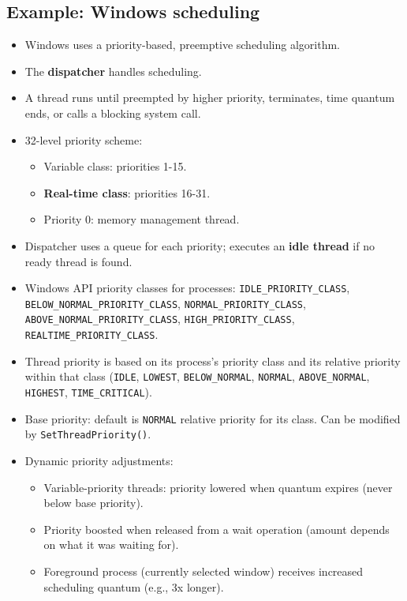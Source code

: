 \subsection{Example: Windows scheduling}
\begin{itemize}
    \item Windows uses a priority-based, preemptive scheduling algorithm.
    \item The \textbf{dispatcher} handles scheduling.
    \item A thread runs until preempted by higher priority, terminates, time quantum ends, or calls a blocking system call.
    \item 32-level priority scheme:
        \begin{itemize}
            \item Variable class: priorities 1-15.
            \item \textbf{Real-time class}: priorities 16-31.
            \item Priority 0: memory management thread.
        \end{itemize}
    \item Dispatcher uses a queue for each priority; executes an \textbf{idle thread} if no ready thread is found.
    \item Windows API priority classes for processes: \texttt{IDLE\_PRIORITY\_CLASS}, \texttt{BELOW\_NORMAL\_PRIORITY\_CLASS}, \texttt{NORMAL\_PRIORITY\_CLASS}, \texttt{ABOVE\_NORMAL\_PRIORITY\_CLASS}, \texttt{HIGH\_PRIORITY\_CLASS}, \texttt{REALTIME\_PRIORITY\_CLASS}.
    \item Thread priority is based on its process's priority class and its relative priority within that class (\texttt{IDLE}, \texttt{LOWEST}, \texttt{BELOW\_NORMAL}, \texttt{NORMAL}, \texttt{ABOVE\_NORMAL}, \texttt{HIGHEST}, \texttt{TIME\_CRITICAL}).
    \item Base priority: default is \texttt{NORMAL} relative priority for its class. Can be modified by \texttt{SetThreadPriority()}.
    \item Dynamic priority adjustments:
        \begin{itemize}
            \item Variable-priority threads: priority lowered when quantum expires (never below base priority).
            \item Priority boosted when released from a wait operation (amount depends on what it was waiting for).
            \item Foreground process (currently selected window) receives increased scheduling quantum (e.g., 3x longer).

\end{itemize}
\end{itemize}
